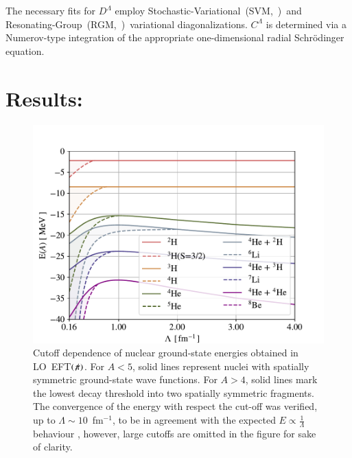 \documentclass[preprint,12pt]{elsarticle}
\newcommand{\lec}{C^\Lambda}
\newcommand{\led}{D^\Lambda}
\newcommand{\eftnopi}{\mbox{EFT$(\not \! \pi)$}}
\begin{document}
The necessary fits for $\led$ employ Stochastic-Variational~(SVM,~\cite{Suzuki:1631377})~and
Resonating-Group~(RGM,~\cite{PhysRev.52.1083,hmh-rrgm})~variational diagonalizations. $\lec$ is
determined via a Numerov-type integration of the appropriate one-dimensional
radial Schr\"odinger equation.





\section*{Results:}


\begin{figure}
\centering
\includegraphics[width=\linewidth]{./Nuclear.pdf} 
\caption{Cutoff dependence of nuclear ground-state energies
obtained in LO~\eftnopi. For $A<5$, solid lines represent nuclei with
spatially symmetric ground-state wave functions. For $A>4$,
solid lines mark the lowest decay threshold into two spatially symmetric fragments.
The convergence of the energy with respect the cut-off was verified, up to $\Lambda\sim 10$~fm$^{-1}$, to be in agreement with the expected $E\propto\tfrac{1}{\Lambda}$ behaviour \cite{Bedaque:1998kg, Barnea:2013uqa}, however, large cutoffs are omitted in the figure for sake of clarity.}
\label{fig:nuclear}
\end{figure}
\end{document}
